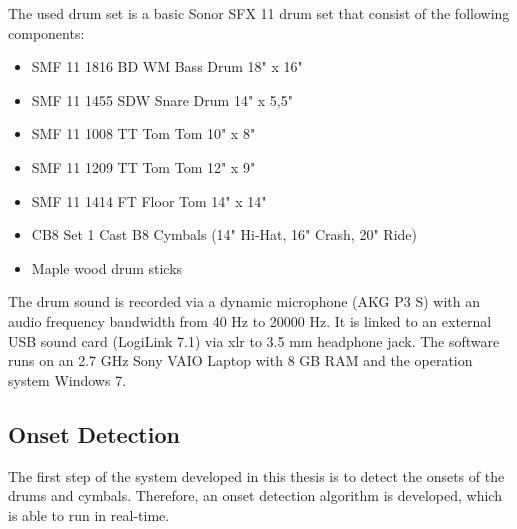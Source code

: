 The used drum set is a basic Sonor SFX 11 drum set that consist of the following components:

\begin{itemize} 
	\item SMF 11 1816 BD WM Bass Drum 18" x 16"
	\item SMF 11 1455 SDW Snare Drum 14" x 5,5"
	\item SMF 11 1008 TT Tom Tom 10" x 8"
	\item SMF 11 1209 TT Tom Tom 12" x 9"
	\item SMF 11 1414 FT Floor Tom 14" x 14"
	\item CB8 Set 1 Cast B8 Cymbals (14" Hi-Hat, 16" Crash, 20" Ride)
	\item Maple wood drum sticks
\end{itemize}

The drum sound is recorded via a dynamic microphone (AKG P3 S) with an audio frequency bandwidth from	40 Hz to 20000 Hz. It is linked to an external USB sound card (LogiLink 7.1) via xlr to 3.5 mm headphone jack. The software runs on an 2.7 GHz Sony VAIO Laptop with 8 GB RAM and the operation system Windows 7.

\subsection{Onset Detection} \label{section:onsetdetectionmethod}

The first step of the system developed in this thesis is to detect the onsets of the drums and cymbals. Therefore, an onset detection algorithm is developed, which is able to run in real-time.

